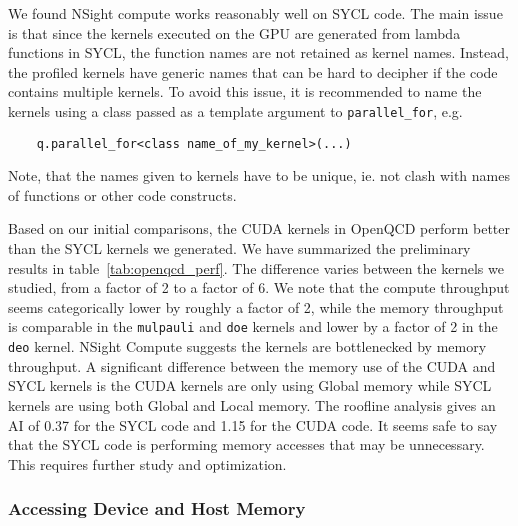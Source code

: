 We found NSight compute works reasonably well on SYCL code.
The main issue is that since the kernels executed on the GPU are generated from lambda functions in SYCL, the function names are not retained as kernel names.
Instead, the profiled kernels have generic names that can be hard to decipher if the code contains multiple kernels.
To avoid this issue, it is recommended to name the kernels using a class passed as a template argument to \verb #parallel_for#, e.g.
\begin{verbatim}
    q.parallel_for<class name_of_my_kernel>(...)
\end{verbatim}
Note, that the names given to kernels have to be unique, ie. not clash with names of functions or other code constructs.

Based on our initial comparisons, the CUDA kernels in OpenQCD perform better than the SYCL kernels we generated.
We have summarized the preliminary results in table~\ref{tab:openqcd_perf}.
The difference varies between the kernels we studied, from a factor of 2 to a factor of 6.
We note that the compute throughput seems categorically lower by roughly a factor of 2, while the memory throughput is comparable in the \verb #mulpauli# and \verb #doe# kernels and lower by a factor of 2 in the \verb #deo# kernel.
NSight Compute suggests the kernels are bottlenecked by memory throughput.
A significant difference between the memory use of the CUDA and SYCL kernels is the CUDA kernels are only using Global memory while SYCL kernels are using both Global and Local memory.
The roofline analysis gives an AI of 0.37 for the SYCL code and 1.15 for the CUDA code.
It seems safe to say that the SYCL code is performing memory accesses that may be unnecessary.
This requires further study and optimization.

\subsubsection{Accessing Device and Host Memory}\label{sec:openqcd_memoryaccess}


